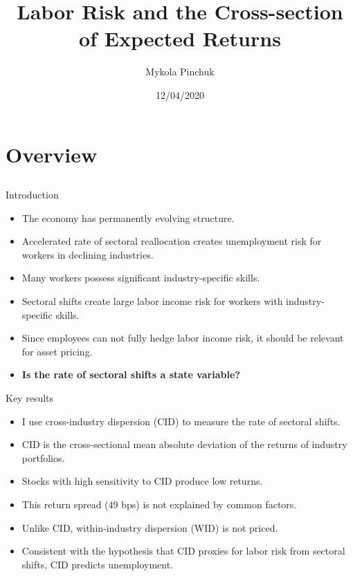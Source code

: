 \documentclass{beamer}
\title{Labor Risk and the Cross-section of Expected Returns \\ }
\author{Mykola Pinchuk}
\date{12/04/2020}
\begin{document}
\begin{frame}
  \titlepage
\end{frame}

\section{Overview}
\subsection{}

\begin{frame}{Introduction}
\begin{itemize}
    \item {The economy has permanently evolving structure.}
    \item {Accelerated rate of sectoral reallocation creates unemployment risk for workers in declining industries.}
    \item {Many workers possess significant industry-specific skills.}
    \item {Sectoral shifts create large labor income risk for workers with industry-specific skills.}
    \item {Since employees can not fully hedge labor income risk, it should be relevant for asset pricing.}
    \item {\textbf{Is the rate of sectoral shifts a state variable?}}
\end{itemize}

\end{frame}


\begin{frame}{Key results}
\begin{itemize}
    \item {I use cross-industry dispersion (CID) to measure the rate of sectoral shifts.}
    \item {CID is the cross-sectional mean absolute deviation of the returns of industry portfolios.}
    \item {Stocks with high sensitivity to CID produce low returns.}
    \item {This return spread (49 bps) is not explained by common factors.}
    \item {Unlike CID, within-industry dispersion (WID) is not priced.}
    \item {Consistent with the hypothesis that CID proxies for labor risk from sectoral shifts, CID predicts unemployment.}
\end{itemize}
\end{frame}
\end{document}
